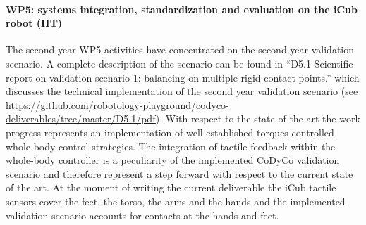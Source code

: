 
\paragraph*{WP5: systems integration, standardization and evaluation on the iCub robot (IIT)}

The second year WP5 activities have concentrated on the second year validation scenario. A complete description of the scenario can be found in ``D5.1 Scientific report on validation scenario 1: balancing on multiple rigid contact points.'' which discusses the technical implementation of the second year validation scenario (see \url{https://github.com/robotology-playground/codyco-deliverables/tree/master/D5.1/pdf}). With respect to the state of the art the work progress represents an implementation of well established torques controlled whole-body control strategies. The integration of tactile feedback within the whole-body controller is a peculiarity of the implemented CoDyCo validation scenario and therefore represent a step forward with respect to the current state of the art. At the moment of writing the current deliverable the iCub tactile sensors cover the feet, the torso, the arms and the hands and the implemented validation scenario accounts for contacts at the hands and feet.